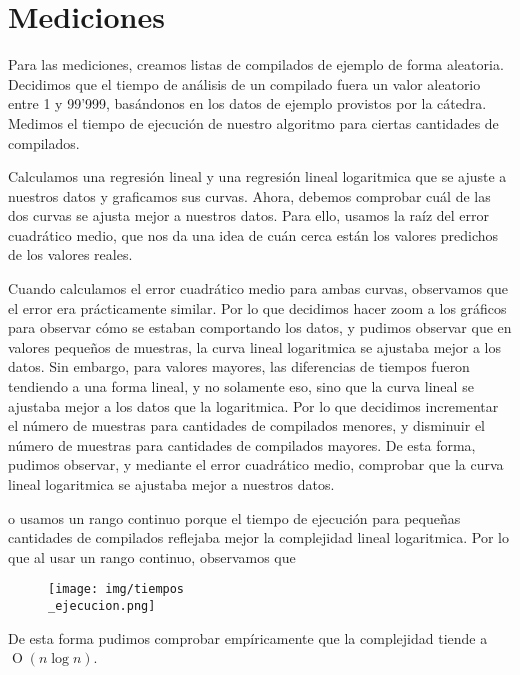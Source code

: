 \section{Mediciones}

Para las mediciones, creamos listas de compilados de ejemplo de forma aleatoria. Decidimos que el tiempo
de análisis de un compilado fuera un valor aleatorio entre 1 y 99'999, basándonos en los datos de ejemplo
provistos por la cátedra.
Medimos el tiempo de ejecución de nuestro algoritmo para ciertas cantidades de compilados.

Calculamos una regresión lineal y una regresión lineal logaritmica que se ajuste a nuestros datos y graficamos sus curvas.
Ahora, debemos comprobar cuál de las dos curvas se ajusta mejor a nuestros datos. Para ello, usamos la raíz del
error cuadrático medio, que nos da una idea de cuán cerca están los valores predichos de los valores reales.

Cuando calculamos el error cuadrático medio para ambas curvas, observamos que el error era prácticamente similar.
Por lo que decidimos hacer zoom a los gráficos para observar cómo se estaban comportando los datos, y pudimos observar
que en valores pequeños de muestras, la curva lineal logaritmica se ajustaba mejor a los datos.
Sin embargo, para valores mayores, las diferencias de tiempos fueron tendiendo a una forma lineal, y no solamente eso, sino que
la curva lineal se ajustaba mejor a los datos que la logaritmica. Por lo que decidimos incrementar el número de
muestras para cantidades de compilados menores, y disminuir el número de muestras para cantidades de compilados
mayores. De esta forma, pudimos observar, y mediante el error cuadrático medio, comprobar que la curva lineal logaritmica
se ajustaba mejor a nuestros datos.


o usamos un 
rango continuo porque el tiempo de ejecución para pequeñas cantidades de compilados reflejaba mejor
la complejidad lineal logaritmica. Por lo que al usar un rango continuo, observamos que 

\begin{figure}[H]
    \centering
    \texttt{[image: img/tiempos\\\_ejecucion.png]}
\end{figure}



De esta forma pudimos comprobar empíricamente que la complejidad tiende a $\operatorname{O}(n\log{n})$.